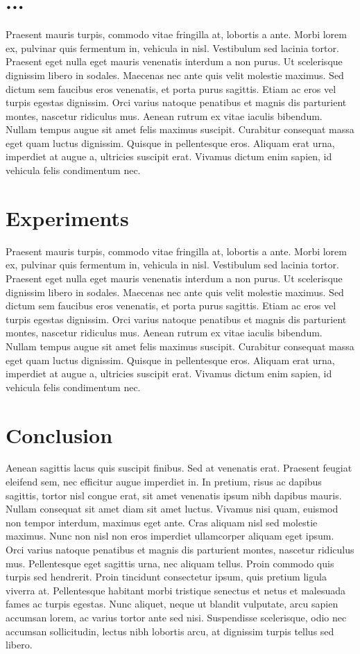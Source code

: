 \documentclass[
    a4paper,
    11pt,              %
    DIV10,             %
    BCOR12mm,           %
    headsepline,       %
    cleardoublepage=empty,  %
    listof=totoc,       %
    bibliography=totocnumbered,  %
    chapterprefix,     %
    appendixprefix,
    numbers=noenddot,  %
    captions=tableheading,  %
]{scrbook}             %
\theoremstyle{break}
\begin{document}
\chapter{...}
Praesent mauris turpis, commodo vitae fringilla at, lobortis a ante. Morbi lorem ex, pulvinar quis fermentum in, vehicula in nisl. Vestibulum sed lacinia tortor. Praesent eget nulla eget mauris venenatis interdum a non purus. Ut scelerisque dignissim libero in sodales. Maecenas nec ante quis velit molestie maximus. Sed dictum sem faucibus eros venenatis, et porta purus sagittis. Etiam ac eros vel turpis egestas dignissim. Orci varius natoque penatibus et magnis dis parturient montes, nascetur ridiculus mus. Aenean rutrum ex vitae iaculis bibendum. Nullam tempus augue sit amet felis maximus suscipit. Curabitur consequat massa eget quam luctus dignissim. Quisque in pellentesque eros. Aliquam erat urna, imperdiet at augue a, ultricies suscipit erat. Vivamus dictum enim sapien, id vehicula felis condimentum nec.

\chapter{Experiments}
Praesent mauris turpis, commodo vitae fringilla at, lobortis a ante. Morbi lorem ex, pulvinar quis fermentum in, vehicula in nisl. Vestibulum sed lacinia tortor. Praesent eget nulla eget mauris venenatis interdum a non purus. Ut scelerisque dignissim libero in sodales. Maecenas nec ante quis velit molestie maximus. Sed dictum sem faucibus eros venenatis, et porta purus sagittis. Etiam ac eros vel turpis egestas dignissim. Orci varius natoque penatibus et magnis dis parturient montes, nascetur ridiculus mus. Aenean rutrum ex vitae iaculis bibendum. Nullam tempus augue sit amet felis maximus suscipit. Curabitur consequat massa eget quam luctus dignissim. Quisque in pellentesque eros. Aliquam erat urna, imperdiet at augue a, ultricies suscipit erat. Vivamus dictum enim sapien, id vehicula felis condimentum nec.

\chapter{Conclusion}
Aenean sagittis lacus quis suscipit finibus. Sed at venenatis erat. Praesent feugiat eleifend sem, nec efficitur augue imperdiet in. In pretium, risus ac dapibus sagittis, tortor nisl congue erat, sit amet venenatis ipsum nibh dapibus mauris. Nullam consequat sit amet diam sit amet luctus. Vivamus nisi quam, euismod non tempor interdum, maximus eget ante. Cras aliquam nisl sed molestie maximus. Nunc non nisl non eros imperdiet ullamcorper aliquam eget ipsum. Orci varius natoque penatibus et magnis dis parturient montes, nascetur ridiculus mus. Pellentesque eget sagittis urna, nec aliquam tellus. Proin commodo quis turpis sed hendrerit. Proin tincidunt consectetur ipsum, quis pretium ligula viverra at. Pellentesque habitant morbi tristique senectus et netus et malesuada fames ac turpis egestas. Nunc aliquet, neque ut blandit vulputate, arcu sapien accumsan lorem, ac varius tortor ante sed nisi. Suspendisse scelerisque, odio nec accumsan sollicitudin, lectus nibh lobortis arcu, at dignissim turpis tellus sed libero.
\end{document}
